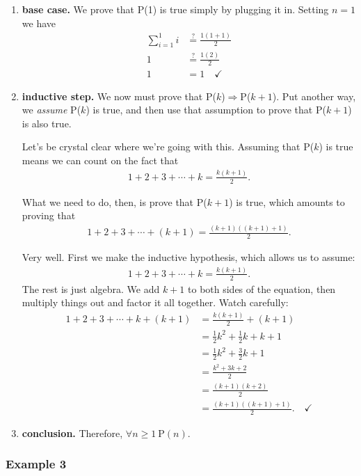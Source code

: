 \begin{enumerate} 

\item \textbf{base case.} We prove that P(1) is true simply by plugging it
in. Setting $n=1$ we have
\begin{align*}
\sum_{i=1}^1{i} & \stackrel{?}{=} \frac{1(1+1)}{2} \\
1 & \stackrel{?}{=} \frac{1(2)}{2} \\
1 &= 1 \quad \checkmark
\end{align*}

\item \textbf{inductive step.}
We now must prove that P($k$)$\Rightarrow$P($k+1$). Put another way, we
\textit{assume} P($k$) is true, and then use that assumption to prove that
P($k+1$) is also true.

Let's be crystal clear where we're going with this. Assuming that P($k$) is
true means we can count on the fact that
\begin{align*}
1+2+3+\cdots+k = \frac{k(k+1)}{2}.
\end{align*}

What we need to do, then, is prove that P($k+1$) is true, which amounts to
proving that
\begin{align*}
1+2+3+\cdots+(k+1) = \frac{(k+1)((k+1)+1)}{2}.
\end{align*}

Very well. First we make the inductive hypothesis, which allows us to
assume:
\begin{align*}
1+2+3+\cdots+k = \frac{k(k+1)}{2}.
\end{align*}
The rest is just algebra. We add $k+1$ to both sides of the equation, then
multiply things out and factor it all together. Watch carefully:
\begin{align*}
1+2+3+\cdots+k+(k+1) &= \frac{k(k+1)}{2} + (k+1) \\
&= \frac{1}{2}k^2 + \frac{1}{2}k + k + 1 \\
&= \frac{1}{2}k^2 + \frac{3}{2}k + 1 \\
&= \frac{k^2+3k+2}{2} \\
&= \frac{(k+1)(k+2)}{2} \\
&= \frac{(k+1)((k+1)+1)}{2}. \quad \checkmark
\end{align*}
\item \textbf{conclusion.} Therefore, $\forall n\geq1 \ \text{P}(n)$.
\end{enumerate}


\subsubsection{Example 3}


